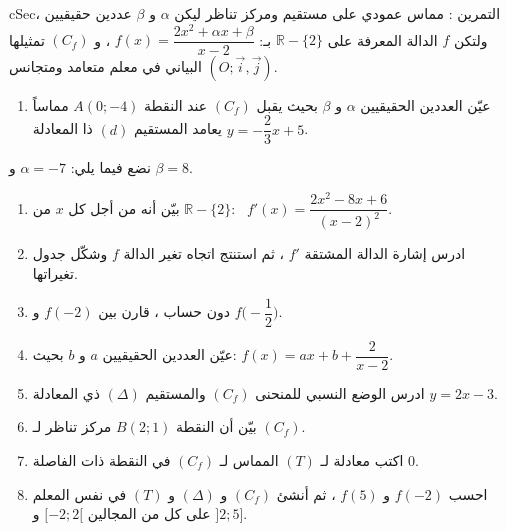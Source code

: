 \documentclass[12pt,a4paper]{article}
\newenvironment{BOX}[2]{\begin{otherlanguage}{english}\begin{arbox}{#1}{#2}}{\end{arbox}\end{otherlanguage}}
\newcounter{exo}
\newenvironment{tamrin}[1]{\stepcounter{exo}\begin{BOX}{cSec}{التمرين \theexo: #1}}{\end{BOX}}
\newcommand{\R}{\mathbb{R}}
\begin{document}
\begin{tamrin}{مماس عمودي على مستقيم ومركز تناظر}
ليكن $\alpha$ و $\beta$ عددين حقيقيين ، ولتكن $f$ الدالة المعرفة على $\R-\{2\}$ بـ: $f(x)=\dfrac{2x^2+\alpha x+\beta}{x-2}$ ، و $(C_f)$ تمثيلها البياني في معلم متعامد ومتجانس $(O;\vec i,\vec j)$.
\begin{enumerate}
\item عيّن العددين الحقيقيين $\alpha$ و $\beta$ بحيث يقبل $(C_f)$ عند النقطة $A(0;-4)$ مماساً يعامد المستقيم $(d)$ ذا المعادلة $y=-\dfrac23x+5$.
\end{enumerate}
نضع فيما يلي: $\alpha=-7$ و $\beta=8$.
\begin{enumerate}[resume]
\item بيّن أنه من أجل كل $x$ من $\R-\{2\}$: \ $f'(x)=\dfrac{2x^2-8x+6}{(x-2)^2}$.
\item ادرس إشارة الدالة المشتقة $f'$ ، ثم استنتج اتجاه تغير الدالة $f$ وشكّل جدول تغيراتها.
\item دون حساب ، قارن بين $f(-2)$ و $f\Big(-\dfrac12\Big)$.
\item عيّن العددين الحقيقيين $a$ و $b$ بحيث: $f(x)=ax+b+\dfrac{2}{x-2}$.
\item ادرس الوضع النسبي للمنحنى $(C_f)$ والمستقيم $(\Delta)$ ذي المعادلة $y=2x-3$.
\item بيّن أن النقطة $B(2;1)$ مركز تناظر لـ $(C_f)$.
\item اكتب معادلة لـ $(T)$ المماس لـ $(C_f)$ في النقطة ذات الفاصلة $0$.
\item احسب $f(-2)$ و $f(5)$ ، ثم أنشئ $(C_f)$ و $(\Delta)$ و $(T)$ في نفس المعلم على كل من المجالين $[-2;2[$ و $]2;5]$.
\end{enumerate}
\end{tamrin}
\end{document}
